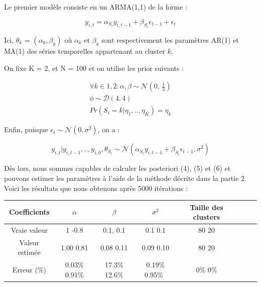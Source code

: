 Le premier modèle consiste en un ARMA(1,1) de la forme : 

\begin{equation*}
y_{i,t} = \alpha_{S_i}y_{i,t-1} + \beta_{S_i}\epsilon_{t-1}  + \epsilon_t
\end{equation*}

Ici, $\theta_k$ = $(\alpha_k,\beta_k)$ où $\alpha_k$ et $\beta_k$ sont respectivement les paramètres AR(1) et MA(1) des séries temporelles appartenant au cluster $k$. 


On fixe K = 2, et N = 100 et on utilise les prior suivants : 

\begin{equation*}
\begin{split}
\forall k \in 1,2 :  \alpha,\beta \sim \mathcal{N}(0,\,\frac{1}{3})\\
                        \phi \sim \mathcal{D}(4,4)\\
                        Pr(S_i = k | \eta_1,..,\eta_K) = \eta_k
\end{split}
\end{equation*}

Enfin, puisque $\epsilon_t \sim \mathcal{N}(0,\sigma^2)$, on a :

\begin{equation*}
y_{i,t}|y_{i,t-1},..,y_{i,0},\theta_{S_i} \sim \mathcal{N}(\alpha_{S_i}y_{i,t-1} + \beta_{S_i}\epsilon_{t-1}, \sigma^2) 
\end{equation*}

Dès lors, nous sommes capables de calculer les posteriori (4), (5) et (6) et pouvons estimer les paramètres à l'aide de la méthode décrite dans la partie 2.
\newline
\\
Voici les résultats que nous obtenons après 5000 itérations : 
\newline
\begin{center}
    \begin{tabular}{|c|c|c|c|c|c|c|c|}
        \hline
        \textbf{Coefficients} & $\alpha$ & $\beta$  & $\sigma^2$ &Taille des clusters\\ 
        \hline
        Vraie valeur & 1 -0.8  & 0.1, 0.1 & 0.1 0.1 & 80 20\\ 
        \hline
        Valeur estimée & 1.00 0.81 & 0.08 0.11  & 0.09 0.10 & 80 20\\
        \hline
        Erreur (\%) & 0.03\% 0.91\%  & 17.3\% 12.6\%  &  0.19\% 0.95\%\ & 0\% 0\%\\
        \hline
    \end{tabular} 
\end{center}
\vspace{0.4cm}
\newline

